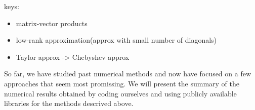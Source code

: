 keys:
\begin{itemize}
  \item matrix-vector products
  \item low-rank approximation(approx with small number of diagonals)
  \item Taylor approx -> Chebyshev approx
\end{itemize}




So far, we have studied past numerical methods and now have focused on a few approaches that seem most promissing.
We will present the summary of the numerical results obtained by coding ourselves and using publicly available libraries for the methods descrived above.

